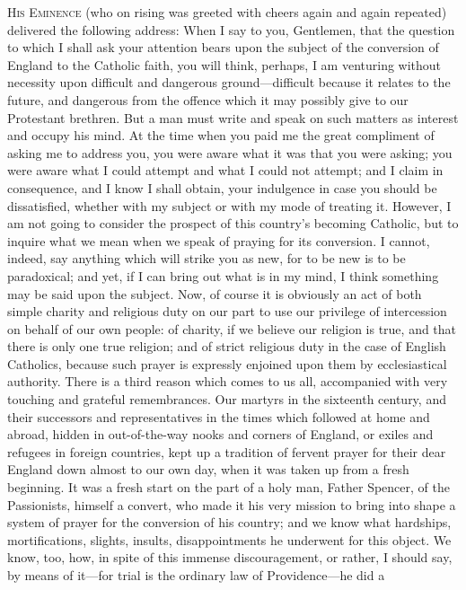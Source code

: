 H\textsc{is}
E\textsc{minence} (who on rising was greeted with cheers
again and again repeated) delivered the following address: When I say
to you, Gentlemen, that the question to which I shall ask your
attention bears upon the subject of the conversion of England to the
Catholic faith, you will think, perhaps, I am venturing without
necessity upon difficult and dangerous ground—difficult because it
relates to the future, and dangerous from the offence which it may
possibly give to our Protestant brethren. But a man must write and
speak on such matters as interest and occupy his mind. At the time
when you paid me the great compliment of asking me to address you, you
were aware what it was that you were asking; you were aware what I
could attempt and what I could not attempt; and I claim in
consequence, and I know I shall obtain, your indulgence in case you
should be dissatisfied, whether with my subject or with my mode of
treating it. However, I am not going to consider the prospect of this
country's becoming Catholic, but to inquire what we mean when we speak
of praying for its conversion. I cannot, indeed, say anything which
will strike you as new, for to be new is to be paradoxical; and yet,
if I can bring out what is in my mind, I think something may be said
upon the subject. Now, of course it is obviously an act of both simple
charity and religious duty on our part to use our privilege of
intercession on behalf of our own people: of charity, if we believe
our religion is true, and that there is only one true religion; and of
strict religious duty in the case of English Catholics, because such
prayer is expressly enjoined upon them by ecclesiastical authority.
There is a third reason which comes to us all, accompanied with
very touching and grateful remembrances. Our martyrs in the sixteenth
century, and their successors and representatives in the times which
followed at home and abroad, hidden in out-of-the-way nooks and
corners of England, or exiles and refugees in foreign countries, kept
up a tradition of fervent prayer for their dear England down almost to
our own day, when it was taken up from a fresh beginning. It was a
fresh start on the part of a holy man, Father Spencer, of the
Passionists, himself a convert, who made it his very mission to bring
into shape a system of prayer for the conversion of his country; and
we know what hardships, mortifications, slights, insults,
disappointments he underwent for this object. We know, too, how, in
spite of this immense discouragement, or rather, I should say, by
means of it—for trial is the ordinary law of Providence—he did a
